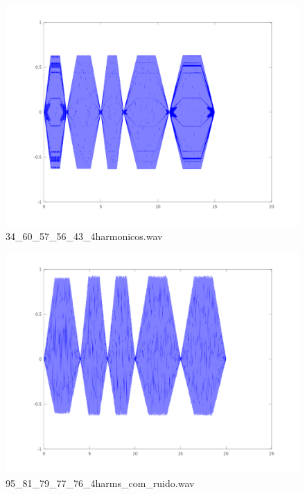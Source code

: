 \documentclass[brazil,times]{abnt}
\begin{document}
			\begin{figure}[h!]
			\begin{center}
			  \includegraphics[width=150mm]{imagens/34_60_57_56_43_4harmonicos_tempo.png}
			  \caption[34\_60\_57\_56\_43\_4harmonicos.wav]{34\_60\_57\_56\_43\_4harmonicos.wav}
			\end{center}
			\end{figure}

			\begin{figure}[h!]
			\begin{center}
			  \includegraphics[width=150mm]{imagens/95_81_79_77_76_4harms_com_ruido_tempo.png}
			  \caption[95\_81\_79\_77\_76\_4harms\_com\_ruido.wav]{95\_81\_79\_77\_76\_4harms\_com\_ruido.wav}
			\end{center}
			\end{figure}
\end{document}
